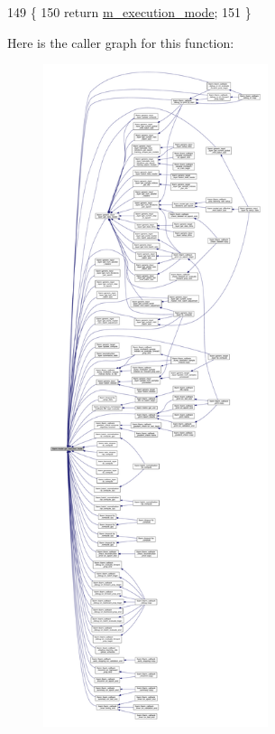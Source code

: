 \begin{DoxyCode}
149                                                    \{
150     \textcolor{keywordflow}{return} \hyperlink{classlbann_1_1model_a2166e2aad256a335ace3bdcae5da2614}{m\_execution\_mode};
151   \}
\end{DoxyCode}
Here is the caller graph for this function\+:\nopagebreak
\begin{figure}[H]
\begin{center}
\leavevmode
\includegraphics[height=550pt]{classlbann_1_1model_addb40597cf29aa6d31b6a7d09ef48608_icgraph}
\end{center}
\end{figure}
\mbox{\label{classlbann_1_1model_ae14f4b2cc8882b3739d4aeb25d9e73c9}} 
